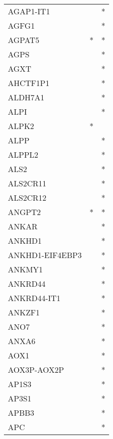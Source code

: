 \begin{longtable}{lcc}
AGAP1-IT1       &                &          * \\
AGFG1           &                &          * \\
AGPAT5          &              * &          * \\
AGPS            &                &          * \\
AGXT            &                &          * \\
AHCTF1P1        &                &          * \\
ALDH7A1         &                &          * \\
ALPI            &                &          * \\
ALPK2           &              * &            \\
ALPP            &                &          * \\
ALPPL2          &                &          * \\
ALS2            &                &          * \\
ALS2CR11        &                &          * \\
ALS2CR12        &                &          * \\
ANGPT2          &              * &          * \\
ANKAR           &                &          * \\
ANKHD1          &                &          * \\
ANKHD1-EIF4EBP3 &                &          * \\
ANKMY1          &                &          * \\
ANKRD44         &                &          * \\
ANKRD44-IT1     &                &          * \\
ANKZF1          &                &          * \\
ANO7            &                &          * \\
ANXA6           &                &          * \\
AOX1            &                &          * \\
AOX3P-AOX2P     &                &          * \\
AP1S3           &                &          * \\
AP3S1           &                &          * \\
APBB3           &                &          * \\
APC             &                &          * \\

\end{longtable}
